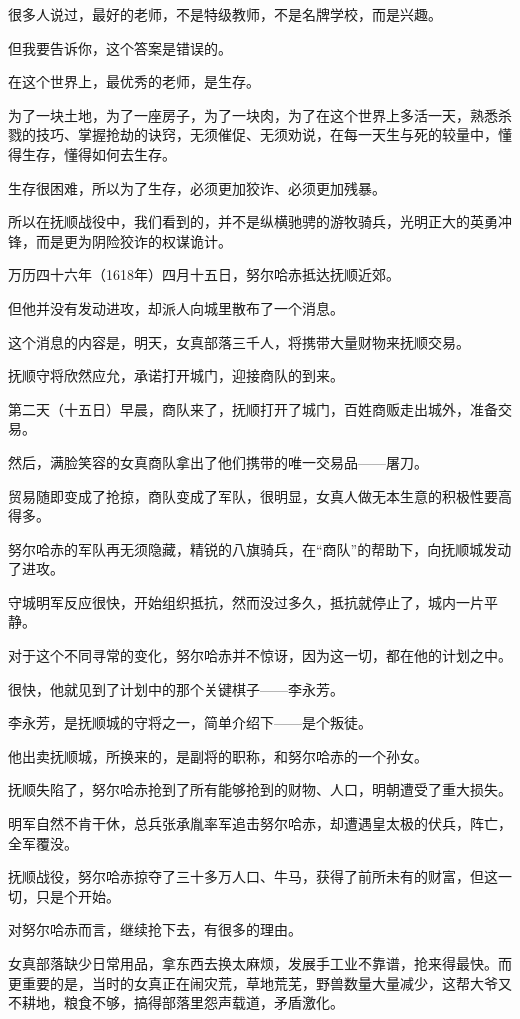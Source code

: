 \begin{multicols}{\theparacolNo}
		很多人说过，最好的老师，不是特级教师，不是名牌学校，而是兴趣。

		但我要告诉你，这个答案是错误的。

		在这个世界上，最优秀的老师，是生存。

		为了一块土地，为了一座房子，为了一块肉，为了在这个世界上多活一天，熟悉杀戮的技巧、掌握抢劫的诀窍，无须催促、无须劝说，在每一天生与死的较量中，懂得生存，懂得如何去生存。

		生存很困难，所以为了生存，必须更加狡诈、必须更加残暴。

		所以在抚顺战役中，我们看到的，并不是纵横驰骋的游牧骑兵，光明正大的英勇冲锋，而是更为阴险狡诈的权谋诡计。

		万历四十六年（1618年）四月十五日，努尔哈赤抵达抚顺近郊。

		但他并没有发动进攻，却派人向城里散布了一个消息。

		这个消息的内容是，明天，女真部落三千人，将携带大量财物来抚顺交易。

		抚顺守将欣然应允，承诺打开城门，迎接商队的到来。

		第二天（十五日）早晨，商队来了，抚顺打开了城门，百姓商贩走出城外，准备交易。

		然后，满脸笑容的女真商队拿出了他们携带的唯一交易品——屠刀。

		贸易随即变成了抢掠，商队变成了军队，很明显，女真人做无本生意的积极性要高得多。

		努尔哈赤的军队再无须隐藏，精锐的八旗骑兵，在“商队”的帮助下，向抚顺城发动了进攻。

		守城明军反应很快，开始组织抵抗，然而没过多久，抵抗就停止了，城内一片平静。

		对于这个不同寻常的变化，努尔哈赤并不惊讶，因为这一切，都在他的计划之中。

		很快，他就见到了计划中的那个关键棋子——李永芳。

		李永芳，是抚顺城的守将之一，简单介绍下——是个叛徒。

		他出卖抚顺城，所换来的，是副将的职称，和努尔哈赤的一个孙女。

		抚顺失陷了，努尔哈赤抢到了所有能够抢到的财物、人口，明朝遭受了重大损失。

		明军自然不肯干休，总兵张承胤率军追击努尔哈赤，却遭遇皇太极的伏兵，阵亡，全军覆没。

		抚顺战役，努尔哈赤掠夺了三十多万人口、牛马，获得了前所未有的财富，但这一切，只是个开始。

		对努尔哈赤而言，继续抢下去，有很多的理由。

		女真部落缺少日常用品，拿东西去换太麻烦，发展手工业不靠谱，抢来得最快。而更重要的是，当时的女真正在闹灾荒，草地荒芜，野兽数量大量减少，这帮大爷又不耕地，粮食不够，搞得部落里怨声载道，矛盾激化。


\end{multicols}
